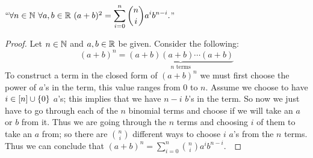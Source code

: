         \begin{theorem}
            $``\forall n \in \mathbb{N} \ \forall a, b \in \mathbb{R} \ (a + b)^2 = \displaystyle\sum_{i = 0}^{n} \binom{n}{i}a^ib^{n - i}.$''
            \label{Binomial Theorem}
        \end{theorem}
        \begin{proof}
            Let $n \in \mathbb{N}$ and $a, b \in \mathbb{R}$ be given. Consider the following:
            \[
                (a + b)^n = \underbrace{(a + b)(a + b) \cdots (a + b)}_{\mbox{$n$ terms}}
            \]
            To construct a term in the closed form of $(a + b)^n$ we must first choose the power
            of $a$'s in the term, this value ranges from 0 to $n$. Assume we choose to have
            $i \in [n] \cup \left\{0\right\}$ $a$'s; this
            implies that we have $n - i$ $b$'s in the term. So now we just have to go through each
            of the $n$ binomial terms and choose if we will take an $a$ or $b$ from it. Thus we
            are going through the $n$ terms and choosing $i$ of them to take an $a$ from; so there
            are $\binom{n}{i}$ different ways to choose $i$ $a$'s from the $n$ terms. Thus we can
            conclude that $(a + b)^n = \sum_{i = 0}^{n} \binom{n}{i} a^ib^{n - i}$.~\QED
        \end{proof}
